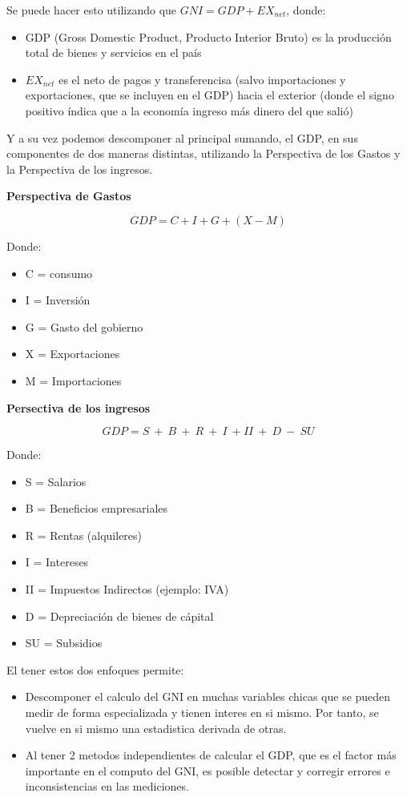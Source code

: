 Se puede hacer esto utilizando que $GNI = GDP + EX_{net}$, donde:
\begin{itemize}
    \item GDP (Gross Domestic Product, Producto Interior Bruto) es la producción total de bienes y servicios en el país
    \item $EX_{net}$ es el neto de pagos y transferencisa (salvo importaciones y exportaciones, que se incluyen en el GDP) hacia el exterior (donde el signo positivo índica que a la economía ingreso más dinero del que salió)
\end{itemize}

Y a su vez podemos descomponer al principal sumando, el GDP, en sus componentes de dos maneras distintas, utilizando la Perspectiva de los Gastos y la Perspectiva de los ingresos.

\textbf{Perspectiva de Gastos}

$$
GDP = C + I + G + (X-M)
$$

Donde:
\begin{itemize}
    \item C = consumo
    \item I = Inversión
    \item G = Gasto del gobierno
    \item X = Exportaciones
    \item M = Importaciones
\end{itemize}

\textbf{Persectiva de los ingresos}

$$
GDP = S\ +\ B\ +\ R\ +\ I\ + II\ +\ D\ -\ SU 
$$

Donde:
\begin{itemize}
    \item S = Salarios
    \item B = Beneficios empresariales
    \item R = Rentas (alquileres)
    \item I = Intereses
    \item II = Impuestos Indirectos (ejemplo: IVA)
    \item D = Depreciación de bienes de cápital
    \item SU = Subsidios
\end{itemize}

El tener estos dos enfoques permite:

\begin{itemize}
    \item Descomponer el calculo del GNI en muchas variables chicas que se pueden medir de forma especializada y tienen interes en si mismo. Por tanto, se vuelve en si mismo una estadistica derivada de otras.
    \item Al tener 2 metodos independientes de calcular el GDP, que es el factor más importante en el computo del GNI, es posible detectar y corregir errores e inconsistencias en las mediciones.
\end{itemize}

